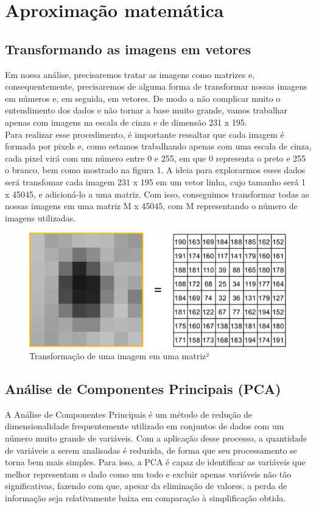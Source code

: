 \documentclass{article}
\begin{document}
\section{Aproximação matemática}

\subsection{Transformando as imagens em vetores}
Em nossa análise, precisaremos tratar as imagens como matrizes e, consequentemente, precisaremos de alguma forma de transformar nossas imagens em números e, em seguida, em vetores. De modo a não complicar muito o entendimento dos dados e não tornar a base muito grande, vamos trabalhar apenas com imagens na escala de cinza e de dimensão 231 x 195.\\

Para realizar esse procedimento, é importante ressaltar que cada imagem é formada por pixels e, como estamos trabalhando apenas com uma escala de cinza, cada pixel virá com um número entre 0 e 255, em que 0 representa o preto e 255 o branco, bem como mostrado na figura 1. A ideia para explorarmos esses dados será transfomar cada imagem 231 x 195 em um vetor linha, cujo tamanho será 1 x 45045, e adicioná-lo a uma matriz. Com isso, conseguimos transformar todas as nossas imagens em uma matriz M x 45045, com M representando o número de imagens utilizadas.

\begin{figure}[ht]
    \centering
    \includegraphics[width=0.5\linewidth]{Grayscale-image-expressed-in-a-matrix-of-numbers-that-computers-can-process-a-8-bit.png}
    \caption{Transformação de uma imagem em uma matriz²}
    \label{fig:enter-label}
\end{figure}

\subsection{Análise de Componentes Principais (PCA)}

A Análise de Componentes Principais é um método de redução de dimensionalidade frequentemente utilizado em conjuntos de dados com um número muito grande de variáveis. Com a aplicação desse processo, a quantidade de variáveis a serem analisadas é reduzida, de forma que seu processamento se torna bem mais simples. Para isso, a PCA é capaz de identificar as variáveis que melhor representam o dado como um todo e excluir apenas variáveis não tão significativas, fazendo com que, apesar da eliminação de valores, a perda de informação seja relativamente baixa em comparação à simplificação obtida.\\
\end{document}
